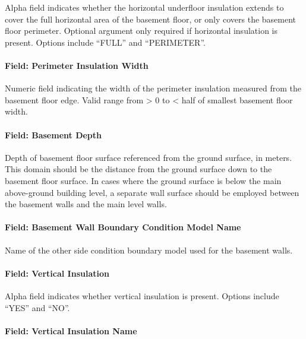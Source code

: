 Alpha field indicates whether the horizontal underfloor insulation extends to cover the full horizontal area of the basement floor, or only covers the basement floor perimeter. Optional argument only required if horizontal insulation is present. Options include ``FULL'' and ``PERIMETER''.

\paragraph{Field: Perimeter Insulation Width}\label{field-perimeter-insulation-width-1}

Numeric field indicating the width of the perimeter insulation measured from the basement floor edge. Valid range from \textgreater{} 0 to \textless{} half of smallest basement floor width.

\paragraph{Field: Basement Depth}\label{field-basement-depth}

Depth of basement floor surface referenced from the ground surface, in meters. This domain should be the distance from the ground surface down to the basement floor surface. In cases where the ground surface is below the main above-ground building level, a separate wall surface should be employed between the basement walls and the main level walls.

\paragraph{Field: Basement Wall Boundary Condition Model Name}\label{field-basement-wall-boundary-condition-model-name}

Name of the other side condition boundary model used for the basement walls.

\paragraph{Field: Vertical Insulation}\label{field-vertical-insulation-1}

Alpha field indicates whether vertical insulation is present. Options include ``YES'' and ``NO''.

\paragraph{Field: Vertical Insulation Name}\label{field-vertical-insulation-name-1}

